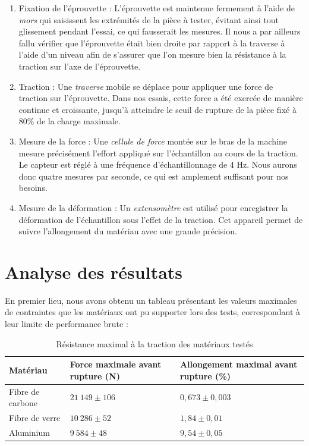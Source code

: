 \begin{enumerate}
    \item Fixation de l’éprouvette :
    L’éprouvette est maintenue fermement à l’aide de \textit{mors} qui saisissent les extrémités de la pièce à tester, évitant ainsi tout glissement pendant l’essai, ce qui fausserait les mesures.
    Il nous a par ailleurs fallu vérifier que l'éprouvette était bien droite par rapport à la traverse à l'aide d'un niveau afin de s'assurer que l'on mesure bien la résistance à la traction sur l'axe de l'éprouvette.
    \item Traction :
    Une \textit{traverse} mobile se déplace pour appliquer une force de traction sur l'éprouvette.
    Dans nos essais, cette force a été exercée de manière continue et croissante, jusqu’à atteindre le seuil de rupture de la pièce fixé à 80\% de la charge maximale.

    \item Mesure de la force :
    Une \textit{cellule de force} montée sur le bras de la machine mesure précisément l’effort appliqué sur l’échantillon au cours de la traction.
    Le capteur est réglé à une fréquence d'échantillonnage de 4 Hz.
    Nous aurons donc quatre mesures par seconde, ce qui est amplement suffisant pour nos besoins.

    \item Mesure de la déformation :
    Un \textit{extensomètre} est utilisé pour enregistrer la déformation de l’échantillon sous l’effet de la traction. Cet appareil permet de suivre l’allongement du matériau avec une grande précision.
\end{enumerate}


\section{Analyse des résultats}
En premier lieu, nous avons obtenu un tableau présentant les valeurs maximales de contraintes que les matériaux ont pu supporter lors des tests, correspondant à leur limite de performance brute :
\begin{table}[h]
    \centering
    \renewcommand{\arraystretch}{1.5}
    \begin{tabular}{|p{4cm}|p{4cm}|p{4cm}|}
        \hline
        \textbf{Matériau} & \textbf{Force maximale avant rupture (N)} & \textbf{Allongement maximal avant rupture (\%)} \\ \hline
        Fibre de carbone  & $21\ 149 \pm 106$                         & $0,673 \pm 0,003$                               \\ \hline
        Fibre de verre    & $10\ 286 \pm 52$                          & $1,84 \pm 0,01$                                 \\ \hline
        Aluminium         & $9\ 584 \pm 48$                           & $9,54 \pm 0,05$                                 \\ \hline
    \end{tabular}
    \caption{Résistance maximal à la traction des matériaux testés\label{tab:comparaison_materiaux}}
\end{table}

